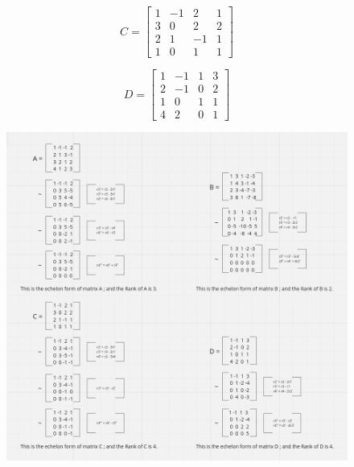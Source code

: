 \documentclass{article}
\begin{document}
    \begin{center}
    \begin{minipage}{0.45\textwidth}
    \[ C = \begin{bmatrix} 1 & -1 & 2 & 1 \\ 3 & 0 & 2 & 2 \\ 2 & 1 & -1 & 1 \\ 1 & 0 & 1 & 1 \end{bmatrix} \]
    \end{minipage}
    \hspace{0.05\textwidth}
    \begin{minipage}{0.45\textwidth}
    \[ D = \begin{bmatrix} 1 & -1 & 1 & 3 \\ 2 & -1 & 0 & 2 \\ 1 & 0 & 1 & 1 \\ 4 & 2 & 0 & 1 \end{bmatrix} \]
    \end{minipage}
    \end{center}

    \vspace{120pt}

    \begin{figure}[htbp]
        \centering
        \includegraphics[width=1.2\textwidth, height=.95\textheight]{../asset/rankOfExc.png}
        \label{fig:example}
    \end{figure}
    
\end{document}
